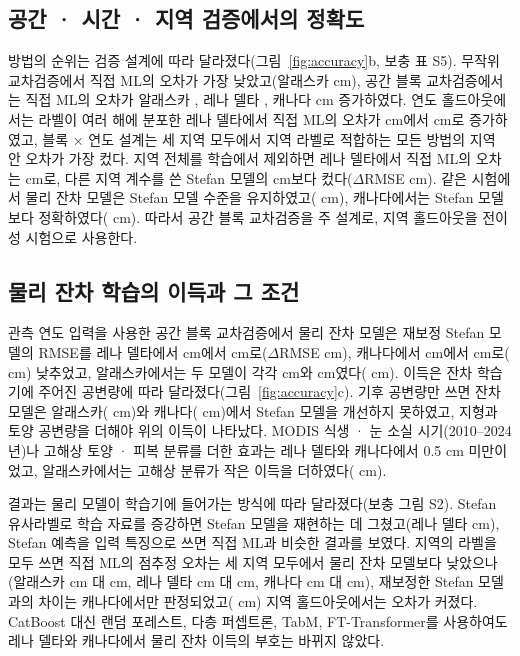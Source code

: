 \subsection{공간 · 시간 · 지역 검증에서의 정확도}
방법의 순위는 검증 설계에 따라 달라졌다(그림~\ref{fig:accuracy}b, 보충 표 S5). 무작위 교차검증에서 직접 ML의 오차가 가장 낮았고(알래스카 \nrmseAkrandDz{} cm), 공간 블록 교차검증에서는 직접 ML의 오차가 알래스카 \noptimAkDz, 레나 델타 \noptimLeDz, 캐나다 \noptimCaDz{} cm 증가하였다. 연도 홀드아웃에서는 라벨이 여러 해에 분포한 레나 델타에서 직접 ML의 오차가 \nrmseLeblkDz{} cm에서 \nrmseLeyrDz{} cm로 증가하였고, 블록 × 연도 설계는 세 지역 모두에서 지역 라벨로 적합하는 모든 방법의 지역 안 오차가 가장 컸다. 지역 전체를 학습에서 제외하면 레나 델타에서 직접 ML의 오차는 \nrmseLeregDz{} cm로, 다른 지역 계수를 쓴 Stefan 모델의 \nrmseLeregPz{} cm보다 컸다($\Delta$RMSE \ndrefLeregDz{} cm). 같은 시험에서 물리 잔차 모델은 Stefan 모델 수준을 유지하였고(\ndrefLeregRo{} cm), 캐나다에서는 Stefan 모델보다 정확하였다(\ndrefCaregRo{} cm). 따라서 공간 블록 교차검증을 주 설계로, 지역 홀드아웃을 전이성 시험으로 사용한다.

\subsection{물리 잔차 학습의 이득과 그 조건}
관측 연도 입력을 사용한 공간 블록 교차검증에서 물리 잔차 모델은 재보정 Stefan 모델의 RMSE를 레나 델타에서 \nrmseLeblkPo{} cm에서 \nrmseLeblkRo{} cm로($\Delta$RMSE \ndrefLeblkRo{} cm), 캐나다에서 \nrmseCablkPo{} cm에서 \nrmseCablkRo{} cm로(\ndrefCablkRo{} cm) 낮추었고, 알래스카에서는 두 모델이 각각 \nrmseAkblkPo{} cm와 \nrmseAkblkRo{} cm였다(\ndrefAkblkRo{} cm). 이득은 잔차 학습기에 주어진 공변량에 따라 달라졌다(그림~\ref{fig:accuracy}c). 기후 공변량만 쓰면 잔차 모델은 알래스카(\ndfeatAkFclim{} cm)와 캐나다(\ndfeatCaFclim{} cm)에서 Stefan 모델을 개선하지 못하였고, 지형과 토양 공변량을 더해야 위의 이득이 나타났다. MODIS 식생 · 눈 소실 시기(2010--2024년)나 고해상 토양 · 피복 분류를 더한 효과는 레나 델타와 캐나다에서 0.5 cm 미만이었고, 알래스카에서는 고해상 분류가 작은 이득을 더하였다(\ndfeatAkFhires{} cm).

결과는 물리 모델이 학습기에 들어가는 방식에 따라 달라졌다(보충 그림 S2). Stefan 유사라벨로 학습 자료를 증강하면 Stefan 모델을 재현하는 데 그쳤고(레나 델타 \ndrefLeblkDo{} cm), Stefan 예측을 입력 특징으로 쓰면 직접 ML과 비슷한 결과를 보였다. 지역의 라벨을 모두 쓰면 직접 ML의 점추정 오차는 세 지역 모두에서 물리 잔차 모델보다 낮았으나(알래스카 \nrmseAkblkDz{} cm 대 \nrmseAkblkRo{} cm, 레나 델타 \nrmseLeblkDz{} cm 대 \nrmseLeblkRo{} cm, 캐나다 \nrmseCablkDz{} cm 대 \nrmseCablkRo{} cm), 재보정한 Stefan 모델과의 차이는 캐나다에서만 판정되었고(\ndrefCablkDz{} cm) 지역 홀드아웃에서는 오차가 커졌다. CatBoost 대신 랜덤 포레스트, 다층 퍼셉트론, TabM, FT-Transformer를 사용하여도 레나 델타와 캐나다에서 물리 잔차 이득의 부호는 바뀌지 않았다.

